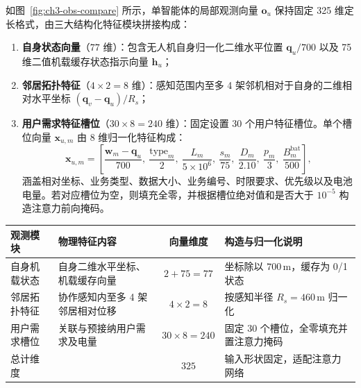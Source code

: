 如图~\ref{fig:ch3-obs-compare} 所示，单智能体的局部观测向量 $\mathbf o_u$ 保持固定 325 维定长格式，由三大结构化特征模块拼接构成：
\begin{enumerate}
    \item \textbf{自身状态向量}（$77$ 维）：包含无人机自身归一化二维水平位置 $\mathbf q_u / 700$ 以及 75 维二值机载缓存状态指示向量 $\mathbf h_u$；
    \item \textbf{邻居拓扑特征}（$4\times 2 = 8$ 维）：感知范围内至多 4 架邻机相对于自身的二维相对水平坐标 $(\mathbf q_v - \mathbf q_u) / R_s$；
    \item \textbf{用户需求特征槽位}（$30\times 8 = 240$ 维）：固定设置 30 个用户特征槽位。单个槽位向量 $\mathbf x_{u,m}$ 由 8 维归一化特征构成：
    \begin{equation}
        \mathbf x_{u,m} = \left[
        \frac{\mathbf w_m - \mathbf q_u}{700}, \
        \frac{\mathrm{type}_m}{2}, \
        \frac{L_m}{5\times 10^6}, \
        \frac{s_m}{75}, \
        \frac{D_m}{2.10}, \
        \frac{p_m}{3}, \
        \frac{B_m^{\mathrm{bat}}}{500}
        \right],
        \label{eq:ch3-ue-slot}
    \end{equation}
    涵盖相对坐标、业务类型、数据大小、业务编号、时限要求、优先级以及电池电量。若对应槽位为空，则填充全零，并根据槽位绝对值和是否大于 $10^{-5}$ 构造注意力前向掩码。
\end{enumerate}

\begin{table}[!htbp]
    \centering
    \label{tab:ch3-observation}
    \footnotesize
    \begin{tabular}{llcl}
        \toprule
        观测模块 & 物理特征内容 & 向量维度 & 构造与归一化说明 \\
        \midrule
        自身机载状态 & 自身二维水平坐标、机载缓存向量 & $2 + 75 = 77$ & 坐标除以 $700\,\mathrm{m}$，缓存为 0/1 状态 \\
        邻居拓扑特征 & 协作感知内至多 4 架邻居相对位移 & $4\times 2 = 8$ & 按感知半径 $R_s=460\,\mathrm{m}$ 归一化 \\
        用户需求槽位 & 关联与预接纳用户需求及电量 & $30\times 8 = 240$ & 固定 30 个槽位，全零填充并置注意力掩码 \\
        \midrule
        总计维度 &  & $325$ & 输入形状固定，适配注意力网络 \\
        \bottomrule
    \end{tabular}
\end{table}

